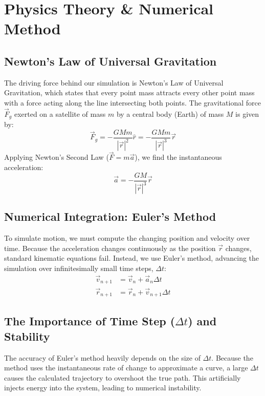 \documentclass[12pt]{article}
\begin{document}
\section{Physics Theory \& Numerical Method}

\subsection{Newton's Law of Universal Gravitation}
The driving force behind our simulation is Newton's Law of Universal Gravitation, which states that every point mass attracts every other point mass with a force acting along the line intersecting both points. The gravitational force $\vec{F}_g$ exerted on a satellite of mass $m$ by a central body (Earth) of mass $M$ is given by:
\begin{equation}
    \vec{F}_g = - \frac{G M m}{|\vec{r}|^2} \hat{r} = - \frac{G M m}{|\vec{r}|^3} \vec{r}
\end{equation}
Applying Newton's Second Law ($\vec{F} = m\vec{a}$), we find the instantaneous acceleration:
\begin{equation}
    \vec{a} = - \frac{G M}{|\vec{r}|^3} \vec{r}
\end{equation}

\subsection{Numerical Integration: Euler's Method}
To simulate motion, we must compute the changing position and velocity over time. Because the acceleration changes continuously as the position $\vec{r}$ changes, standard kinematic equations fail. Instead, we use Euler's method, advancing the simulation over infinitesimally small time steps, $\Delta t$:
\begin{align}
    \vec{v}_{n+1} &= \vec{v}_n + \vec{a}_n \Delta t \\
    \vec{r}_{n+1} &= \vec{r}_n + \vec{v}_{n+1} \Delta t
\end{align}

\subsection{The Importance of Time Step ($\Delta t$) and Stability}
The accuracy of Euler's method heavily depends on the size of $\Delta t$. Because the method uses the instantaneous rate of change to approximate a curve, a large $\Delta t$ causes the calculated trajectory to overshoot the true path. This artificially injects energy into the system, leading to numerical instability. 
\end{document}
